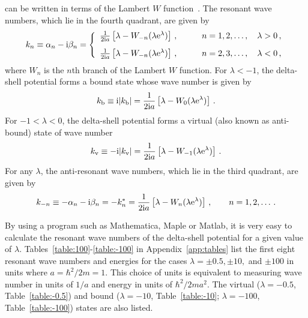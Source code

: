 \documentclass[12pt]{article}
\newcommand{\rmi}{{\rm i}}
\newcommand{\rme}{{\rm e}}
\begin{document}
can be written in terms of the Lambert $W$ 
function~\cite{LAMBERT1,LAMBERT2,LAMBERT3,LAMBERT4,LAMBERT5,LAMBERT6,
NOTE}. The 
resonant wave numbers, which lie in the fourth quadrant, are given by
\begin{equation}
     k_n\equiv \alpha _n-\rmi \beta _n=
\left\{ \begin{array}{lc}
         \frac{1}{2\rmi a } \left[ \lambda -
              W_{-n}(\lambda  \rme ^{\lambda }) \right] \, , \qquad
            &  n = 1, 2, \ldots ,   \quad \lambda > 0 \, , \\ [2ex]
         \frac{1}{2\rmi a } \left[ \lambda -
              W_{-n}(\lambda  \rme ^{\lambda }) \right] \, , \qquad
            &  n = 2, 3, \ldots ,  \quad  \lambda < 0 \, , 
     \end{array}
            \right.
         \label{complexsol}
\end{equation}
where $W_n$ is the $n$th branch of the Lambert $W$ function. For 
$\lambda <-1$, the delta-shell potential forms a bound state whose
wave number is given by
\begin{equation}
     k_{\rm b}\equiv \rmi |k_{\rm b}|= \frac{1}{2\rmi a } \left[ \lambda -
              W_{0}(\lambda  \rme ^{\lambda }) \right] \, .
        \label{boundstate}
\end{equation}
For $-1< \lambda <0$, the delta-shell potential forms a virtual (also
known as anti-bound) state of wave number
\begin{equation}
     k_{\rm v}\equiv -\rmi |k_{\rm v}|= \frac{1}{2\rmi a } \left[ \lambda -
              W_{-1}(\lambda  \rme ^{\lambda }) \right] \, .
        \label{virtualstate}
\end{equation}
For any $\lambda$, the 
anti-resonant wave numbers, which lie in the third quadrant, are given by
\begin{equation}
          k_{-n}\equiv -\alpha _n-\rmi \beta _n= -k_n^* =
              \frac{1}{2\rmi a } \left[ \lambda  -
              W_{n}(\lambda  \rme ^{\lambda }) \right] \, , \qquad
             n = 1, 2, \ldots \, .
        \label{complexsolar}
\end{equation}

By using
a program such as Mathematica, Maple or Matlab, it is very easy to 
calculate the resonant wave numbers of the delta-shell potential for a given 
value of $\lambda$. Tables~\ref{table:100}-\ref{table:-100}
in Appendix~\ref{app:tables} list the first 
eight resonant wave numbers and energies for the cases 
$\lambda = \pm 0.5, \pm 10,$ and $\pm 100$ in units 
where $a=\hbar ^2/2m=1$. This choice of units is equivalent to measuring
wave number in units of $1/a$ and energy in units of $\hbar ^2/2ma^2$. The
virtual ($\lambda = -0.5$, Table~\ref{table:-0.5}) and
bound ($\lambda = -10$, Table~\ref{table:-10}; $\lambda = -100$, 
Table~\ref{table:-100}) states are also listed.
\end{document}
